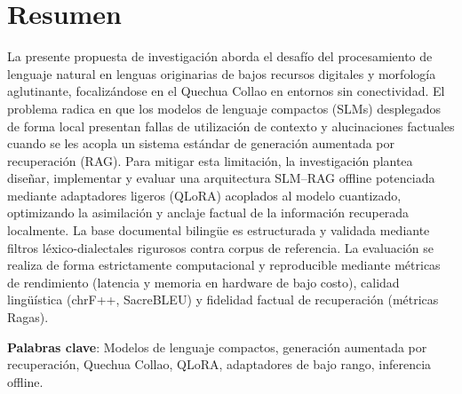 \newpage
{}
{}
\section*{Resumen}
La presente propuesta de investigación aborda el desafío del procesamiento de lenguaje natural en lenguas originarias de bajos recursos digitales y morfología aglutinante, focalizándose en el Quechua Collao en entornos sin conectividad. El problema radica en que los modelos de lenguaje compactos (SLMs) desplegados de forma local presentan fallas de utilización de contexto y alucinaciones factuales cuando se les acopla un sistema estándar de generación aumentada por recuperación (RAG). Para mitigar esta limitación, la investigación plantea diseñar, implementar y evaluar una arquitectura SLM--RAG offline potenciada mediante adaptadores ligeros (QLoRA) acoplados al modelo cuantizado, optimizando la asimilación y anclaje factual de la información recuperada localmente. La base documental bilingüe es estructurada y validada mediante filtros léxico-dialectales rigurosos contra corpus de referencia. La evaluación se realiza de forma estrictamente computacional y reproducible mediante métricas de rendimiento (latencia y memoria en hardware de bajo costo), calidad lingüística (chrF++, SacreBLEU) y fidelidad factual de recuperación (métricas Ragas).

\noindent
\textbf{Palabras clave}: Modelos de lenguaje compactos, generación aumentada por recuperación, Quechua Collao, QLoRA, adaptadores de bajo rango, inferencia offline.

